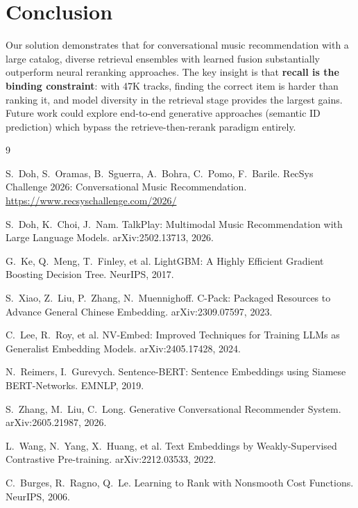 \documentclass[sigconf]{acmart}
\begin{document}
\section{Conclusion}

Our solution demonstrates that for conversational music recommendation with a large catalog, diverse retrieval ensembles with learned fusion substantially outperform neural reranking approaches. The key insight is that \textbf{recall is the binding constraint}: with 47K tracks, finding the correct item is harder than ranking it, and model diversity in the retrieval stage provides the largest gains. Future work could explore end-to-end generative approaches (semantic ID prediction) which bypass the retrieve-then-rerank paradigm entirely.

\begin{thebibliography}{9}

S.~Doh, S.~Oramas, B.~Sguerra, A.~Bohra, C.~Pomo, F.~Barile.
\newblock RecSys Challenge 2026: Conversational Music Recommendation.
\newblock \url{https://www.recsyschallenge.com/2026/}

S.~Doh, K.~Choi, J.~Nam.
\newblock TalkPlay: Multimodal Music Recommendation with Large Language Models.
\newblock arXiv:2502.13713, 2026.

G.~Ke, Q.~Meng, T.~Finley, et al.
\newblock LightGBM: A Highly Efficient Gradient Boosting Decision Tree.
\newblock NeurIPS, 2017.

S.~Xiao, Z.~Liu, P.~Zhang, N.~Muennighoff.
\newblock C-Pack: Packaged Resources to Advance General Chinese Embedding.
\newblock arXiv:2309.07597, 2023.

C.~Lee, R.~Roy, et al.
\newblock NV-Embed: Improved Techniques for Training LLMs as Generalist Embedding Models.
\newblock arXiv:2405.17428, 2024.

N.~Reimers, I.~Gurevych.
\newblock Sentence-BERT: Sentence Embeddings using Siamese BERT-Networks.
\newblock EMNLP, 2019.

S.~Zhang, M.~Liu, C.~Long.
\newblock Generative Conversational Recommender System.
\newblock arXiv:2605.21987, 2026.

L.~Wang, N.~Yang, X.~Huang, et al.
\newblock Text Embeddings by Weakly-Supervised Contrastive Pre-training.
\newblock arXiv:2212.03533, 2022.

C.~Burges, R.~Ragno, Q.~Le.
\newblock Learning to Rank with Nonsmooth Cost Functions.
\newblock NeurIPS, 2006.

\end{thebibliography}
\end{document}
